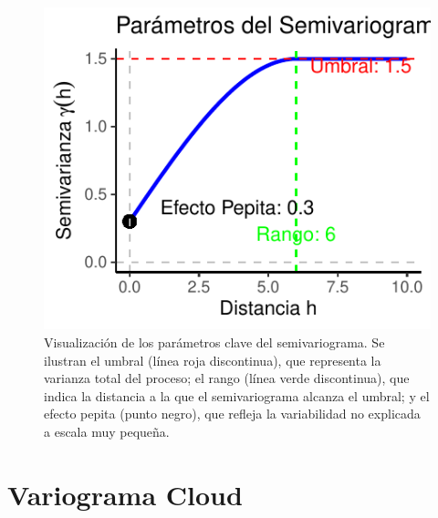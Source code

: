 \documentclass[
  10pt,
  ignorenonframetext,
]{beamer}
\begin{document}
\begin{frame}
\begin{figure}
\centering
\includegraphics{imagenes/unnamed-chunk-1-1.pdf}
\caption{Visualización de los parámetros clave del semivariograma. Se
ilustran el umbral (línea roja discontinua), que representa la varianza
total del proceso; el rango (línea verde discontinua), que indica la
distancia a la que el semivariograma alcanza el umbral; y el efecto
pepita (punto negro), que refleja la variabilidad no explicada a escala
muy pequeña.}
\end{figure}
\end{frame}

\section{Variograma Cloud}\label{variograma-cloud}
\end{document}
